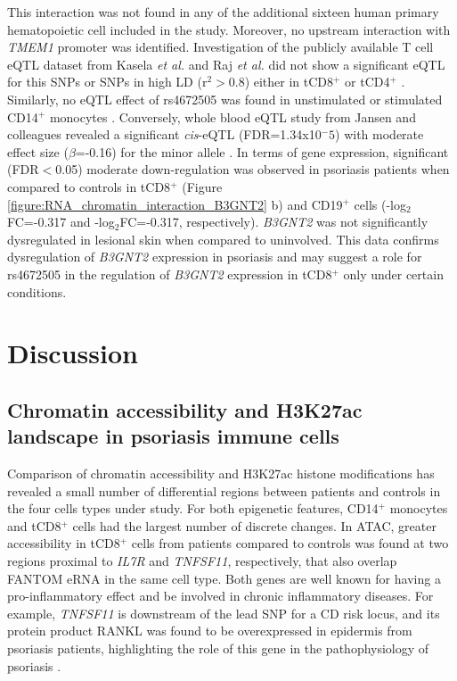 This interaction was not found in any of the additional sixteen human primary hematopoietic cell included in the study. Moreover, no upstream interaction with \textit{TMEM1} promoter was identified. Investigation of the publicly available T cell eQTL dataset from Kasela \textit{et al.} and Raj \textit{et al.} did not show a significant eQTL for this SNPs or SNPs in high LD (r$^2$$>$0.8) either in tCD8$^+$ or tCD4$^+$ \parencite{Raj2014,Kasela2017}. Similarly, no eQTL effect of rs4672505 was found in unstimulated or stimulated CD14$^+$ monocytes \parencite{Fairfax2014}. Conversely, whole blood eQTL study from Jansen and colleagues revealed a significant \textit{cis}-eQTL (FDR=1.34x10$^-5$) with moderate effect size ($\beta$=-0.16) for the minor allele \parencite{Jansen2017}. In terms of gene expression, significant (FDR$<$0.05) moderate down-regulation was observed in psoriasis patients when compared to controls in tCD8$^+$ (Figure \ref{figure:RNA_chromatin_interaction_B3GNT2} b) and CD19$^+$ cells (-log$_2$FC=-0.317 and -log$_2$FC=-0.317, respectively). \textit{B3GNT2} was not significantly dysregulated in lesional skin when compared to uninvolved. This data confirms dysregulation of \textit{B3GNT2} expression in psoriasis and may suggest a role for rs4672505 in the regulation of \textit{B3GNT2} expression in tCD8$^+$ only under certain conditions.  

\section{Discussion}

\subsection{Chromatin accessibility and H3K27ac landscape in psoriasis immune cells}
Comparison of chromatin accessibility and H3K27ac histone modifications has revealed a small number of differential regions between patients and controls in the four cells types under study. For both epigenetic features, CD14$^+$ monocytes and tCD8$^+$ cells had the largest number of discrete changes. In ATAC, greater accessibility in tCD8$^+$ cells from patients compared to controls was found at two regions proximal to \textit{IL7R} and \textit{TNFSF11}, respectively, that also overlap FANTOM eRNA in the same cell type. Both genes are well known for having a pro-inflammatory effect and be involved in chronic inflammatory diseases. For example, \textit{TNFSF11} is downstream of the lead SNP for a CD risk locus, and its protein product RANKL was found to be overexpressed in epidermis from psoriasis patients, highlighting the role of this gene in the pathophysiology of psoriasis \parencite{Toberer2011}. 

